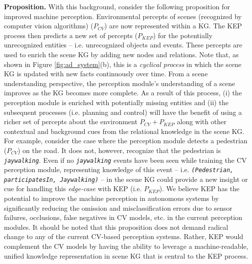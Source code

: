 \documentclass[conference]{IEEEtran}
\begin{document}
\textbf{Proposition.} With this background, consider the following proposition for improved machine perception. Environmental percepts of scenes (recognized by computer vision algorithms) ($P_{CV}$) are now represented within a KG. The KEP process then predicts a new set of percepts ($P_{KEP}$) for the potentially unrecognized entities -- i.e. unrecognized objects and events. These percepts are used to enrich the scene KG by adding new nodes and relations. Note that, as shown in Figure \ref{fig:ad_system}(b), this is a \textit{cyclical process} in which the scene KG is updated with new facts continuously over time. From a scene understanding perspective, the perception module's understanding of a scene improves as the KG becomes more complete. As a result of this process, (i) the perception module is enriched with potentially missing entities and (ii) the subsequent processes (i.e. planning and control) will have the benefit of using a richer set of percepts about the environment $P_{CV} + P_{KEP}$ along with other contextual and background cues from the relational knowledge in the scene KG. For example, consider the case where the perception module detects a pedestrian ($P_{CV}$) on the road. It does not, however, recognize that the pedestrian is \texttt{\textit{jaywalking}}. Even if no \texttt{\textit{jaywalking}} events have been seen while training the CV perception module, representing knowledge of this event -- i.e. \texttt{\textit{(Pedestrian, participatesIn, Jaywalking)}} -- in the scene KG could provide a new insight or cue for handling this \textit{edge-case} with KEP (i.e. $P_{KEP}$). We believe KEP has the potential to improve the machine perception in autonomous systems by significantly reducing the omission and misclassification errors due to sensor failures, occlusions, false negatives in CV models, etc. in the current perception modules. It should be noted that this proposition does not demand radical change to any of the current CV-based perception systems. Rather, KEP would complement the CV models by having the ability to leverage a machine-readable, unified knowledge representation in scene KG that is central to the KEP process.\\
\end{document}
